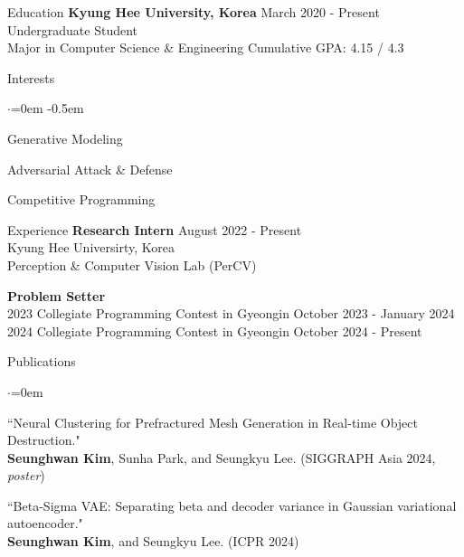 \documentclass{resume}
\begin{document}
\begin{rSection}{Education}
  {\bf Kyung Hee University, Korea } \hfill {March 2020 - Present} \\
  { Undergraduate Student } \\
  { Major in Computer Science \& Engineering \hfill Cumulative GPA: 4.15 / 4.3 }
\end{rSection}

\begin{rSection}{Interests}
  \begin{list}{$\cdot$}{\leftmargin=0em}
    \itemsep -0.5em
    \item Generative Modeling
    \item Adversarial Attack \& Defense
    \item Competitive Programming
  \end{list}
\end{rSection}

\begin{rSection}{Experience}
  {\bf Research Intern } \hfill {August 2022 - Present} \\
  { Kyung Hee Universirty, Korea } \\
  { Perception \& Computer Vision Lab (PerCV) }

  {\bf Problem Setter } \\
  2023 Collegiate Programming Contest in Gyeongin \hfill October 2023 - January 2024 \\
  2024 Collegiate Programming Contest in Gyeongin \hfill October 2024 - Present
\end{rSection}

\begin{rSection}{Publications}
  \begin{list}{$\cdot$}{\leftmargin=0em}
    \item ``Neural Clustering for Prefractured Mesh Generation in Real-time Object Destruction." \\ {\bf Seunghwan Kim}, Sunha Park, and Seungkyu Lee. (SIGGRAPH Asia 2024, {\it poster})
    \item ``Beta-Sigma VAE: Separating beta and decoder variance in Gaussian variational autoencoder." \\ {\bf Seunghwan Kim}, and Seungkyu Lee. (ICPR 2024)
  \end{list}
\end{rSection}
\end{document}
